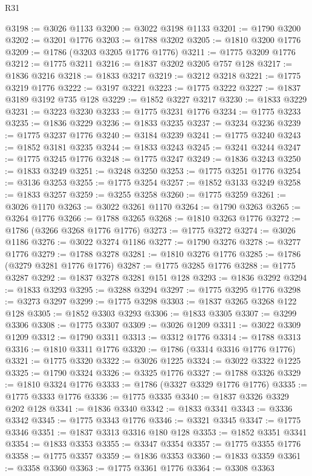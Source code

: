 \begin{lexlean}{R31}
\begin{coremodule}
@3198 := @3026 @1133
@3200 := @3022 @3198 @1133
@3201 := @1790 @3200
@3202 := @3201 @1776
@3203 := @1788 @3202
@3205 := @1810 @3200 @1776
@3209 := @1786 (@3203 @3205 @1776 @1776)
@3211 := @1775 @3209 @1776
@3212 := @1775 @3211
@3216 := @1837 @3202 @3205 @757 @128
@3217 := @1836 @3216
@3218 := @1833 @3217
@3219 := @3212 @3218
@3221 := @1775 @3219 @1776
@3222 := @3197 @3221
@3223 := @1775 @3222
@3227 := @1837 @3189 @3192 @735 @128
@3229 := @1852 @3227 @3217
@3230 := @1833 @3229
@3231 := @3223 @3230
@3233 := @1775 @3231 @1776
@3234 := @1775 @3233
@3235 := @1836 @3229
@3236 := @1833 @3235
@3237 := @3234 @3236
@3239 := @1775 @3237 @1776
@3240 := @3184 @3239
@3241 := @1775 @3240
@3243 := @1852 @3181 @3235
@3244 := @1833 @3243
@3245 := @3241 @3244
@3247 := @1775 @3245 @1776
@3248 := @1775 @3247
@3249 := @1836 @3243
@3250 := @1833 @3249
@3251 := @3248 @3250
@3253 := @1775 @3251 @1776
@3254 := @3136 @3253
@3255 := @1775 @3254
@3257 := @1852 @3133 @3249
@3258 := @1833 @3257
@3259 := @3255 @3258
@3260 := @1775 @3259
@3261 := @3026 @1170
@3263 := @3022 @3261 @1170
@3264 := @1790 @3263
@3265 := @3264 @1776
@3266 := @1788 @3265
@3268 := @1810 @3263 @1776
@3272 := @1786 (@3266 @3268 @1776 @1776)
@3273 := @1775 @3272
@3274 := @3026 @1186
@3276 := @3022 @3274 @1186
@3277 := @1790 @3276
@3278 := @3277 @1776
@3279 := @1788 @3278
@3281 := @1810 @3276 @1776
@3285 := @1786 (@3279 @3281 @1776 @1776)
@3287 := @1775 @3285 @1776
@3288 := @1775 @3287
@3292 := @1837 @3278 @3281 @151 @128
@3293 := @1836 @3292
@3294 := @1833 @3293
@3295 := @3288 @3294
@3297 := @1775 @3295 @1776
@3298 := @3273 @3297
@3299 := @1775 @3298
@3303 := @1837 @3265 @3268 @122 @128
@3305 := @1852 @3303 @3293
@3306 := @1833 @3305
@3307 := @3299 @3306
@3308 := @1775 @3307
@3309 := @3026 @1209
@3311 := @3022 @3309 @1209
@3312 := @1790 @3311
@3313 := @3312 @1776
@3314 := @1788 @3313
@3316 := @1810 @3311 @1776
@3320 := @1786 (@3314 @3316 @1776 @1776)
@3321 := @1775 @3320
@3322 := @3026 @1225
@3324 := @3022 @3322 @1225
@3325 := @1790 @3324
@3326 := @3325 @1776
@3327 := @1788 @3326
@3329 := @1810 @3324 @1776
@3333 := @1786 (@3327 @3329 @1776 @1776)
@3335 := @1775 @3333 @1776
@3336 := @1775 @3335
@3340 := @1837 @3326 @3329 @202 @128
@3341 := @1836 @3340
@3342 := @1833 @3341
@3343 := @3336 @3342
@3345 := @1775 @3343 @1776
@3346 := @3321 @3345
@3347 := @1775 @3346
@3351 := @1837 @3313 @3316 @180 @128
@3353 := @1852 @3351 @3341
@3354 := @1833 @3353
@3355 := @3347 @3354
@3357 := @1775 @3355 @1776
@3358 := @1775 @3357
@3359 := @1836 @3353
@3360 := @1833 @3359
@3361 := @3358 @3360
@3363 := @1775 @3361 @1776
@3364 := @3308 @3363

\end{coremodule}
\end{lexlean}
